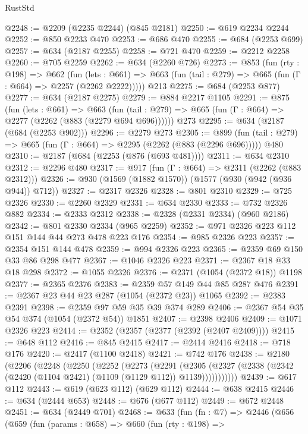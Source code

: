 \begin{lexlean}{RustStd}
\begin{coremodule}
@2248 := @2209 (@2235 @2244) (@845 @2181)
@2250 := @619 @2234 @2244
@2252 := @850 @2233 @470
@2253 := @686 @470
@2255 := @684 (@2253 @699)
@2257 := @634 (@2187 @2255)
@2258 := @721 @470
@2259 := @2212 @2258
@2260 := @705 @2259
@2262 := @634 (@2260 @726)
@2273 := @853
    (fun (rty : @198) =>
    @662
      (fun (lets : @661) =>
      @663 (fun (tail : @279) => @665 (fun (Γ : @664) => @2257 (@2262 @2222)))))
    @213
@2275 := @684 (@2253 @877)
@2277 := @634 (@2187 @2275)
@2279 := @884 @2217 @1105
@2291 := @875
    (fun (lets : @661) =>
    @663 (fun (tail : @279) => @665 (fun (Γ : @664) => @2277 (@2262 (@883 (@2279 @694 @696))))))
    @273
@2295 := @634 (@2187 (@684 (@2253 @902)))
@2296 := @2279 @273
@2305 := @899 (fun (tail : @279) => @665 (fun (Γ : @664) => @2295 (@2262 (@883 (@2296 @696))))) @480
@2310 := @2187 (@684 (@2253 (@876 (@693 @481))))
@2311 := @634 @2310
@2312 := @2296 @480
@2317 := @917 (fun (Γ : @664) => @2311 (@2262 (@883 @2312)))
@2326 := @930 (@1569 (@1882 @1570)) (@1577 (@930 (@942 (@936 @944)) @712))
@2327 := @2317 @2326
@2328 := @801 @2310
@2329 := @725 @2326
@2330 := @2260 @2329
@2331 := @634 @2330
@2333 := @732 @2326 @882
@2334 := @2333 @2312
@2338 := @2328 (@2331 @2334) (@960 @2186)
@2342 := @801 @2330 @2334 (@965 @2259)
@2352 := @971 @2326 @223 @112 @151 @144 @44 @273 @478 @223 @176
@2354 := @985 @2326 @223
@2357 := @2354 @151 @144 @478
@2359 := @994 @2326 @223
@2365 := @2359 @69 @150 @33 @86 @298 @477
@2367 := @1046 @2326 @223
@2371 := @2367 @18 @33 @18 @298
@2372 := @1055 @2326
@2376 := @2371 (@1054 (@2372 @18)) @1198
@2377 := @2365 @2376
@2383 := @2359 @57 @149 @44 @85 @287 @476
@2391 := @2367 @23 @44 @23 @287 (@1054 (@2372 @23)) @1065
@2392 := @2383 @2391
@2398 := @2359 @97 @59 @35 @39 @374 @289
@2406 := @2367 @54 @35 @54 @374 (@1054 (@2372 @54)) @1851
@2407 := @2398 @2406
@2409 := @1071 @2326 @223
@2414 := @2352 (@2357 (@2377 (@2392 (@2407 @2409))))
@2415 := @648 @112
@2416 := @845 @2415
@2417 := @2414 @2416
@2418 := @718 @176
@2420 := @2417 (@1100 @2418)
@2421 := @742 @176
@2438 := @2180
    (@2206
      (@2248
        (@2250
          (@2252
            (@2273
              (@2291
                (@2305
                  (@2327 (@2338 (@2342 (@2420 (@1104 @2421) (@1109 (@1129 @112)) @1139)))))))))))
@2439 := @617 @112
@2443 := @619 (@623 @112) (@629 @112)
@2444 := @638 @2415
@2446 := @634 (@2444 @653)
@2448 := @676 (@677 @112)
@2449 := @672 @2448
@2451 := @634 (@2449 @701)
@2468 := @633
    (fun (fn : @7) =>
    @2446
      (@656
        (@659
          (fun (params : @658) =>
          @660
            (fun (rty : @198) =>

\end{coremodule}
\end{lexlean}
